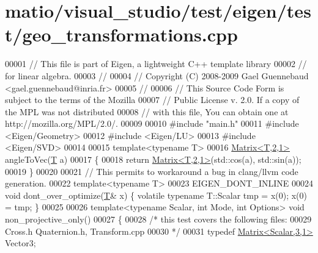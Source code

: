 \hypertarget{matio_2visual__studio_2test_2eigen_2test_2geo__transformations_8cpp_source}{}\section{matio/visual\+\_\+studio/test/eigen/test/geo\+\_\+transformations.cpp}
\label{matio_2visual__studio_2test_2eigen_2test_2geo__transformations_8cpp_source}

\begin{DoxyCode}
00001 \textcolor{comment}{// This file is part of Eigen, a lightweight C++ template library}
00002 \textcolor{comment}{// for linear algebra.}
00003 \textcolor{comment}{//}
00004 \textcolor{comment}{// Copyright (C) 2008-2009 Gael Guennebaud <gael.guennebaud@inria.fr>}
00005 \textcolor{comment}{//}
00006 \textcolor{comment}{// This Source Code Form is subject to the terms of the Mozilla}
00007 \textcolor{comment}{// Public License v. 2.0. If a copy of the MPL was not distributed}
00008 \textcolor{comment}{// with this file, You can obtain one at http://mozilla.org/MPL/2.0/.}
00009 
00010 \textcolor{preprocessor}{#include "main.h"}
00011 \textcolor{preprocessor}{#include <Eigen/Geometry>}
00012 \textcolor{preprocessor}{#include <Eigen/LU>}
00013 \textcolor{preprocessor}{#include <Eigen/SVD>}
00014 
00015 \textcolor{keyword}{template}<\textcolor{keyword}{typename} T>
00016 \hyperlink{group___core___module_class_eigen_1_1_matrix}{Matrix<T,2,1>} angleToVec(\hyperlink{group___sparse_core___module}{T} a)
00017 \{
00018   \textcolor{keywordflow}{return} \hyperlink{group___core___module_class_eigen_1_1_matrix}{Matrix<T,2,1>}(std::cos(a), std::sin(a));
00019 \}
00020 
00021 \textcolor{comment}{// This permits to workaround a bug in clang/llvm code generation.}
00022 \textcolor{keyword}{template}<\textcolor{keyword}{typename} T>
00023 EIGEN\_DONT\_INLINE
00024 \textcolor{keywordtype}{void} dont\_over\_optimize(\hyperlink{group___sparse_core___module}{T}& x) \{ \textcolor{keyword}{volatile} \textcolor{keyword}{typename} T::Scalar tmp = x(0); x(0) = tmp; \}
00025 
00026 \textcolor{keyword}{template}<\textcolor{keyword}{typename} Scalar, \textcolor{keywordtype}{int} Mode, \textcolor{keywordtype}{int} Options> \textcolor{keywordtype}{void} non\_projective\_only()
00027 \{
00028     \textcolor{comment}{/* this test covers the following files:}
00029 \textcolor{comment}{     Cross.h Quaternion.h, Transform.cpp}
00030 \textcolor{comment}{  */}
00031   \textcolor{keyword}{typedef} \hyperlink{group___core___module}{Matrix<Scalar,3,1>} Vector3;

\end{DoxyCode}
